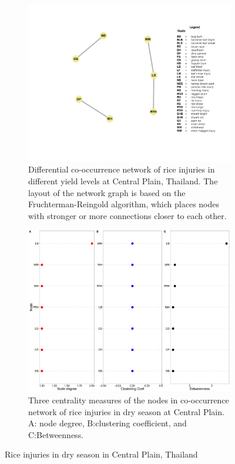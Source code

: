  \begin{figure}
    \centering
    \begin{subfigure}[b]{1\textwidth}
        \includegraphics[width = 1\textwidth]{figures/difyieldRR.pdf}
        \caption{Differential co-occurrence network of rice injuries in different yield levels at Central Plain, Thailand. The layout of the network graph is based on the Fruchterman-Reingold algorithm, which places nodes with stronger or more connections closer to each other.}
        \label{fig:networkCP_ds}
    \end{subfigure}
    \begin{subfigure}[b]{1\textwidth}
        \includegraphics[width = 1\textwidth]{figures/yield_dif_nodepropRed_River_Delta.pdf}
        \caption{Three centrality measures of the nodes in co-occurrence network of rice injuries in dry season at Central Plain. A: node degree, B:clustering coefficient, and C:Betweenness.}
        \label{fig:nodepropdifyield_RR}
    \end{subfigure}
    \caption{Rice injuries in dry season in Central Plain, Thailand}
    \label{fig:CP_ds}
\end{figure}
 
